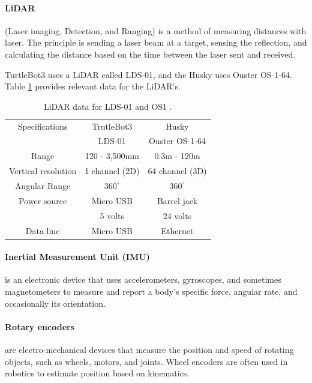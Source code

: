 \paragraph{LiDAR}(Laser imaging, Detection, and Ranging) is a method of measuring distances with laser. The principle is sending a laser beam at a target, sensing the reflection, and calculating the distance based on the time between the laser sent and received. 

TurtleBot3 uses a LiDAR called LDS-01, and the Husky uses Ouster OS-1-64. Table \ref{tab:lidar_data} provides relevant data for the LiDAR's. 

\begin{table}[h]
    \centering
    \caption{LiDAR data for LDS-01\cite{lds01} and OS1 \cite{OS1Datasheet}.}
    \begin{tabular}{c|c|c}
        Specifications          & TrutleBot3        & Husky             \\ 
                                & LDS-01            & Ouster OS-1-64    \\ \hline
        Range                   & 120 - 3,500mm     & 0.3m - 120m       \\ \hline
        Vertical resolution     & 1 channel (2D)    & 64 channel (3D)   \\ \hline
        Angular Range           & $360^\circ$       & $360^\circ$       \\ \hline  
        Power source            & Micro USB         & Barrel jack       \\  
                                & 5 volts           & 24 volts          \\ \hline
        Data line               & Micro USB         & Ethernet          \\       
    \end{tabular}
    \label{tab:lidar_data}
\end{table}

\paragraph{Inertial Measurement Unit (IMU)} is an electronic device that uses accelerometers, gyroscopes, and sometimes magnetometers to measure and report a body's specific force, angular rate, and occasionally its orientation.

\paragraph{Rotary encoders} are electro-mechanical devices that measure the position and speed of rotating objects, such as wheels, motors, and joints. Wheel encoders are often used in robotics to estimate position based on kinematics. 

